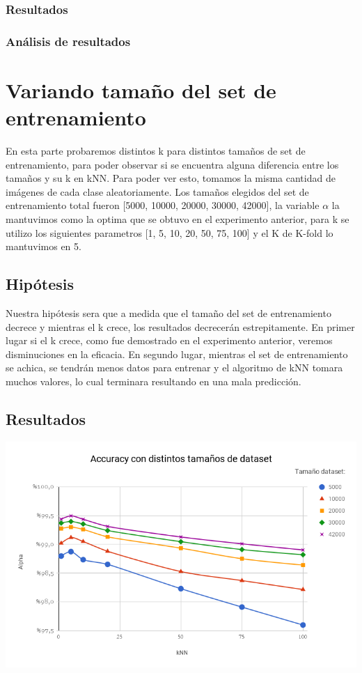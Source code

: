 \subsubsection{Resultados}


\subsubsection{Análisis de resultados}



\section{Variando tamaño del set de entrenamiento}

En esta parte probaremos distintos k para distintos tamaños de set de entrenamiento, para poder observar si se encuentra alguna diferencia entre los tamaños y su k en kNN.
Para poder ver esto, tomamos la misma cantidad de imágenes de cada clase aleatoriamente.  Los tamaños elegidos del set de entrenamiento total fueron [5000, 10000, 20000, 30000, 42000], la variable $\alpha$ la mantuvimos como la optima que se obtuvo en el experimento anterior, para k se utilizo los siguientes parametros [1, 5, 10, 20, 50, 75, 100] y el K de K-fold lo mantuvimos en 5.

\subsection{Hipótesis}

Nuestra hipótesis sera que a medida que el tamaño del set de entrenamiento decrece y mientras el k crece, los resultados decrecerán estrepitamente. En primer lugar si el k crece, como fue demostrado en el experimento anterior, veremos disminuciones en la eficacia. En segundo lugar, mientras el set de entrenamiento se achica, se tendrán menos datos para entrenar y el algoritmo de kNN tomara muchos valores, lo cual terminara resultando en una mala predicción.

\subsection{Resultados}


\begin{center}
   \includegraphics[scale=0.6]{graficos/Accuracy_distintos_tamanos.png}
   \label{Fig. 2}
\end{center}

